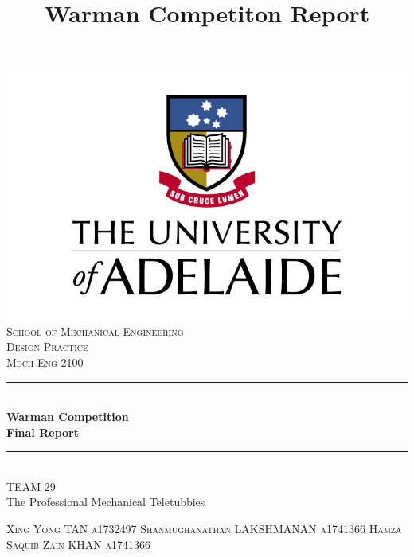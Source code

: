 \documentclass[12pt]{report}
\title{Warman Competiton Report}
\begin{document}
	
\begin{titlepage}
\newcommand{\HRule}{\rule{\linewidth}{0.5mm}}

\center %

\includegraphics{UoA_logo.jpg}\\
\textsc{\large School of Mechanical Engineering}\\[1cm]
\textsc{\Huge Design Practice}\\
\textsc{\large Mech Eng 2100}\\


\HRule \\[0.4cm]
{ \Huge \bfseries Warman Competition}\\[0.2cm]
{ \Huge \bfseries Final Report}\\[0.1cm]
\HRule \\[-0.2cm]


\huge TEAM 29 \\ [-0.2cm]
\Large The Professional Mechanical Teletubbies \\[1 cm]

\begin{minipage}{0.5\textwidth}
\begin{flushleft} \small
  \textsc{Xing Yong TAN}
   \linebreak
 \textsc{a1732497}
 \linebreak
  \linebreak
  \textsc{Shanmughanathan LAKSHMANAN}
   \linebreak 
 \textsc{a1741366}
  \linebreak
  \linebreak
  \textsc{Hamza Saquib Zain KHAN}
  \linebreak
  \textsc{a1741366}
 

\end{flushleft}
\end{minipage}
\end{titlepage}
\end{document}
